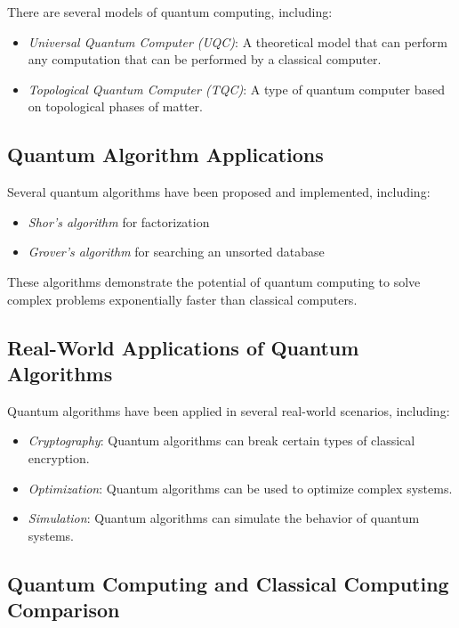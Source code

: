 \documentclass{report}%
\begin{document}
There are several models of quantum computing, including:

\begin{itemize}
\item \textit{Universal Quantum Computer (UQC)}: A theoretical model that can perform any computation that can be performed by a classical computer.
\item \textit{Topological Quantum Computer (TQC)}: A type of quantum computer based on topological phases of matter.
\end{itemize}

\subsection{Quantum Algorithm Applications}

Several quantum algorithms have been proposed and implemented, including:

\begin{itemize}
\item \textit{Shor's algorithm} for factorization
\item \textit{Grover's algorithm} for searching an unsorted database
\end{itemize}

These algorithms demonstrate the potential of quantum computing to solve complex problems exponentially faster than classical computers.

\subsection{Real-World Applications of Quantum Algorithms}

Quantum algorithms have been applied in several real-world scenarios, including:

\begin{itemize}
\item \textit{Cryptography}: Quantum algorithms can break certain types of classical encryption.
\item \textit{Optimization}: Quantum algorithms can be used to optimize complex systems.
\item \textit{Simulation}: Quantum algorithms can simulate the behavior of quantum systems.
\end{itemize}

\subsection{Quantum Computing and Classical Computing Comparison}
\end{document}
